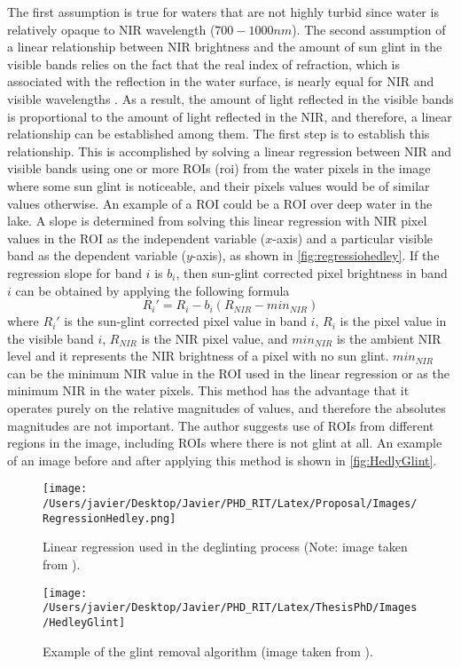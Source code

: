 The first assumption is true for waters that are not highly turbid since water is relatively opaque to NIR wavelength ($700-1000nm$). The second assumption of a linear relationship between NIR brightness and the amount of sun glint in the visible bands relies on the fact that the real index of refraction, which is associated with the reflection in the water surface, is nearly equal for NIR and visible wavelengths \cite{Mobley1994}. As a result, the amount of light reflected in the visible bands is proportional to the amount of light reflected in the NIR, and therefore, a linear relationship can be established among them. The first step is to establish this relationship. This is accomplished by solving a linear regression between NIR and visible bands using one or more ROIs (\gls{roi}) from the water pixels in the image where some sun glint is noticeable, and their pixels values would be of similar values otherwise. An example of a ROI could be a ROI over deep water in the lake. A slope is determined from solving this linear regression with NIR pixel values in the ROI as the independent variable ($x$-axis) and a particular visible band as the dependent variable ($y$-axis), as shown in \autoref{fig:regressiohedley}. If the regression slope for band $i$ is $b_i$, then sun-glint corrected pixel brightness in band $i$ can be obtained by applying the following formula
\begin{equation}\label{eq:deglint}
  R_i' = R_i - b_i(R_{NIR}-min_{NIR})
\end{equation}
where $R_i'$ is the sun-glint corrected pixel value in band $i$, $R_i$ is the pixel value in the visible band $i$, $R_{NIR}$ is the NIR pixel value, and $min_{NIR}$ is the ambient NIR level and it represents the NIR brightness of a pixel with no sun glint. $min_{NIR}$ can be the minimum NIR value in the ROI used in the linear regression or as the minimum NIR in the water pixels. This method has the advantage that it operates purely on the relative magnitudes of values, and therefore the absolutes magnitudes are not important. The author suggests use of ROIs from different regions in the image, including ROIs where there is not glint at all. An example of an image before and after applying this method is shown in \autoref{fig:HedlyGlint}.
\begin{figure}[htb]
  \centering
  \texttt{[image: /Users/javier/Desktop/Javier/PHD\_RIT/Latex/Proposal/Images/RegressionHedley.png]}
  \caption{Linear regression used in the deglinting process (Note: image taken from \cite{Hedley:2005}). \label{fig:regressiohedley} } 
\end{figure}
\begin{figure}[htb]
  \centering
    \texttt{[image: /Users/javier/Desktop/Javier/PHD\_RIT/Latex/ThesisPhD/Images/HedleyGlint]}
    \caption{Example of the glint removal algorithm (image taken from \cite{Hedley:2005}).  \label{fig:HedlyGlint} }
\end{figure}


